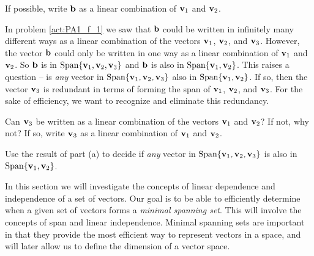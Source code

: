 \begin{pa}
	\item If possible, write $\mathbf{b}$ as a linear combination of $\mathbf{v}_1$ and $\mathbf{v}_2$.  


	\ea


\item In problem \ref{act:PA1_f_1} we saw that $\mathbf{b}$ could be written in infinitely many different ways as a linear combination of the vectors $\mathbf{v}_1$, $\mathbf{v}_2$, and $\mathbf{v}_3$. However, the vector $\mathbf{b}$ could only be written in one way as a linear combination of $\mathbf{v}_1$ and $\mathbf{v}_2$. So $\mathbf{b}$ is in $\text{Span} \{\mathbf{v}_1, \mathbf{v}_2, \mathbf{v}_3\}$ and $\mathbf{b}$ is also in $\text{Span} \{\mathbf{v}_1, \mathbf{v}_2\} $. This raises a question -- is \emph{any} vector in $\text{Span} \{\mathbf{v}_1, \mathbf{v}_2, \mathbf{v}_3\}$ also in $\text{Span}\{\mathbf{v}_1, \mathbf{v}_2\}$. If so, then the vector $\mathbf{v}_3$ is redundant in terms of forming the span of $\mathbf{v}_1$, $\mathbf{v}_2$, and $\mathbf{v}_3$. For the sake of efficiency, we want to recognize and eliminate this redundancy.  
 
	\ba
	\item Can $\mathbf{v}_3$ be written as a linear combination of the vectors $\mathbf{v}_1$ and $\mathbf{v}_2$? If not, why not? If so, write $\mathbf{v}_3$ as a linear combination of $\mathbf{v}_1$ and $\mathbf{v}_2$. 
	
	
	\item Use the result of part (a) to decide if \emph{any} vector in $\text{Span}\{\mathbf{v}_1, \mathbf{v}_2, \mathbf{v}_3\}$ is also in $\text{Span}\{\mathbf{v}_1, \mathbf{v}_2\}$. 


\ea

\ee

\end{pa}


In this section we will investigate the concepts of linear dependence and independence of a set of vectors. Our goal is to be able to efficiently determine when a given set of vectors forms a \emph{minimal spanning set}. This will involve the concepts of span and linear independence. Minimal spanning sets are important in that they provide the most efficient way to represent vectors in a space, and will later allow us to define the dimension of a vector space.  


